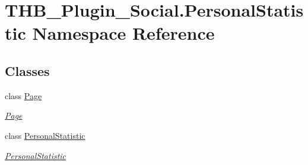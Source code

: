 \hypertarget{namespace_t_h_b___plugin___social_1_1_personal_statistic}{}\section{T\+H\+B\+\_\+\+Plugin\+\_\+\+Social.\+Personal\+Statistic Namespace Reference}
\label{namespace_t_h_b___plugin___social_1_1_personal_statistic}
\subsection*{Classes}
\begin{DoxyCompactItemize}
\item 
class \mbox{\hyperlink{class_t_h_b___plugin___social_1_1_personal_statistic_1_1_page}{Page}}
\begin{DoxyCompactList}\small\item\em \mbox{\hyperlink{class_t_h_b___plugin___social_1_1_personal_statistic_1_1_page}{Page}} \end{DoxyCompactList}\item 
class \mbox{\hyperlink{class_t_h_b___plugin___social_1_1_personal_statistic_1_1_personal_statistic}{Personal\+Statistic}}
\begin{DoxyCompactList}\small\item\em \mbox{\hyperlink{class_t_h_b___plugin___social_1_1_personal_statistic_1_1_personal_statistic}{Personal\+Statistic}} \end{DoxyCompactList}\end{DoxyCompactItemize}
